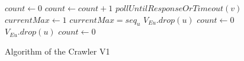 \documentclass{article}
\begin{document}
\begin{itemize}
\end{itemize}

\begin{figure}[H]  \label{CrawlerV1Alg} 
\begin{algorithmic}
\State $count \gets 0$
	\State $count \gets count + 1$
		\State $pollUntilResponseOrTimeout(v)$
	\EndFor
	\State $currentMax \gets 1$
			\State $currentMax = seq_{u}$
		\Else
			\State $V_{Eu}.drop(u)$
			\State $count \gets 0$
		\EndIf
	\EndFor
			\State $V_{Eu}.drop(u)$
			\State $count \gets 0$
		\EndIf
	\EndFor
\EndWhile
\end{algorithmic}
\caption{Algorithm of the Crawler V1}
\end{figure}
\end{document}
